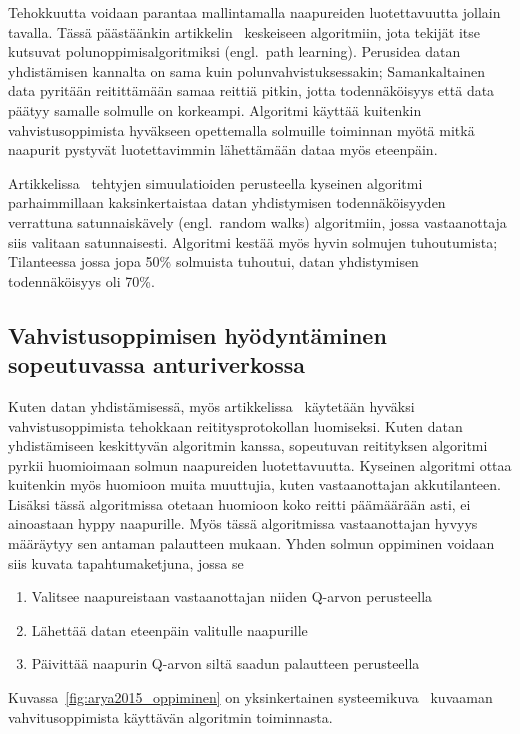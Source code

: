 Tehokkuutta voidaan parantaa mallintamalla naapureiden luotettavuutta jollain
tavalla. Tässä päästäänkin artikkelin~\cite{Yu2006} keskeiseen algoritmiin,
jota tekijät itse kutsuvat polunoppimisalgoritmiksi (engl.\ path learning).
Perusidea datan yhdistämisen kannalta on sama kuin polunvahvistuksessakin;
Samankaltainen data pyritään reitittämään samaa reittiä pitkin, jotta
todennäköisyys että data päätyy samalle solmulle on korkeampi. Algoritmi
käyttää kuitenkin vahvistusoppimista hyväkseen opettemalla solmuille toiminnan
myötä mitkä naapurit pystyvät luotettavimmin lähettämään dataa myös eteenpäin.

Artikkelissa~\cite{Yu2006} tehtyjen simuulatioiden perusteella kyseinen
algoritmi parhaimmillaan kaksinkertaistaa datan yhdistymisen todennäköisyyden
verrattuna satunnaiskävely (engl.\ random walks) algoritmiin, jossa
vastaanottaja siis valitaan satunnaisesti. Algoritmi kestää myös hyvin solmujen
tuhoutumista; Tilanteessa jossa jopa 50\% solmuista tuhoutui, datan
yhdistymisen todennäköisyys oli 70\%.

\subsection{Vahvistusoppimisen hyödyntäminen sopeutuvassa anturiverkossa}

Kuten datan yhdistämisessä, myös artikkelissa~\cite{Arya2015} käytetään hyväksi
vahvistusoppimista tehokkaan reititysprotokollan luomiseksi. Kuten datan
yhdistämiseen
keskittyvän algoritmin kanssa, sopeutuvan reitityksen algoritmi pyrkii
huomioimaan solmun naapureiden luotettavuutta. Kyseinen algoritmi ottaa
kuitenkin myös huomioon muita muuttujia, kuten vastaanottajan akkutilanteen.
Lisäksi tässä algoritmissa otetaan huomioon koko reitti päämäärään asti, ei
ainoastaan hyppy naapurille. Myös tässä algoritmissa vastaanottajan hyvyys
määräytyy sen antaman palautteen mukaan. Yhden solmun oppiminen voidaan siis
kuvata tapahtumaketjuna, jossa se
\begin{enumerate}
  \item Valitsee naapureistaan vastaanottajan niiden Q-arvon perusteella
  \item Lähettää datan eteenpäin valitulle naapurille
  \item Päivittää naapurin Q-arvon siltä saadun palautteen perusteella
\end{enumerate}
Kuvassa~\ref{fig:arya2015_oppiminen} on yksinkertainen
systeemikuva~\cite{Arya2015} kuvaaman vahvitusoppimista käyttävän algoritmin
toiminnasta.

